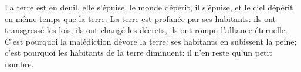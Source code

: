 La terre est en deuil, elle s’épuise,
	le monde dépérit, il s’épuise,
	et le ciel dépérit en même temps que la terre.
La terre est profanée par ses habitants:
	ils ont transgressé les lois, ils ont changé les décrets,
	ils ont rompu l’alliance éternelle.
C’est pourquoi la malédiction dévore la terre:
	ses habitants en subissent la peine;
	c’est pourquoi les habitants de la terre diminuent:
	il n’en reste qu’un petit nombre.
